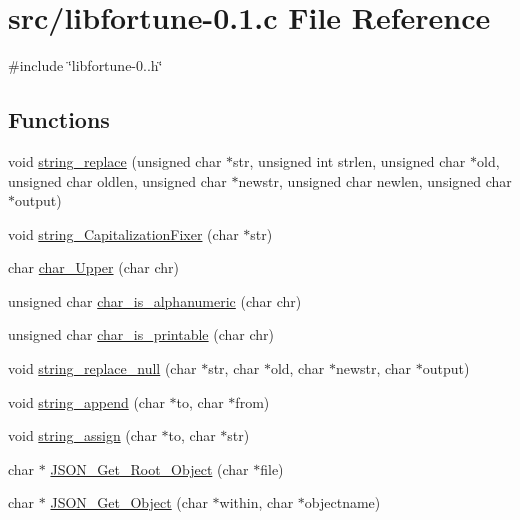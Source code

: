\hypertarget{libfortune-0_81_8c}{\section{src/libfortune-\/0.1.c \-File \-Reference}
\label{libfortune-0_81_8c}
}
{\ttfamily \#include \char`\"{}libfortune-\/0..\-h\char`\"{}}\*
\subsection*{\-Functions}
\begin{DoxyCompactItemize}
\item 
void \hyperlink{libfortune-0_81_8c_a34e8a513afcfa4403dffda13063965e1}{string\-\_\-replace} (unsigned char $\ast$str, unsigned int strlen, unsigned char $\ast$old, unsigned char oldlen, unsigned char $\ast$newstr, unsigned char newlen, unsigned char $\ast$output)
\item 
void \hyperlink{libfortune-0_81_8c_aa97238a3b3c89c08eacae8eef4791ba2}{string\-\_\-\-Capitalization\-Fixer} (char $\ast$str)
\item 
char \hyperlink{libfortune-0_81_8c_aad4c1f6d2aae5997bc9c56902a423169}{char\-\_\-\-Upper} (char chr)
\item 
unsigned char \hyperlink{libfortune-0_81_8c_a2e810294066643b8000791d99fd1fde5}{char\-\_\-is\-\_\-alphanumeric} (char chr)
\item 
unsigned char \hyperlink{libfortune-0_81_8c_ad06e792d0883bbdb216202dba5c93a49}{char\-\_\-is\-\_\-printable} (char chr)
\item 
void \hyperlink{libfortune-0_81_8c_af0154798b85d945348afb48a9a0a750a}{string\-\_\-replace\-\_\-null} (char $\ast$str, char $\ast$old, char $\ast$newstr, char $\ast$output)
\item 
void \hyperlink{libfortune-0_81_8c_ab62809f3ff93cae257d54b93016c7aef}{string\-\_\-append} (char $\ast$to, char $\ast$from)
\item 
void \hyperlink{libfortune-0_81_8c_af7779d4d40718fc33ce0d86ff73554e8}{string\-\_\-assign} (char $\ast$to, char $\ast$str)
\item 
char $\ast$ \hyperlink{libfortune-0_81_8c_a98b13204bb0f4c3dbaef87259767dfcf}{\-J\-S\-O\-N\-\_\-\-Get\-\_\-\-Root\-\_\-\-Object} (char $\ast$file)
\item 
char $\ast$ \hyperlink{libfortune-0_81_8c_ab377ac6d910580c12475a2c52c5a6fbd}{\-J\-S\-O\-N\-\_\-\-Get\-\_\-\-Object} (char $\ast$within, char $\ast$objectname)
\item 

\end{DoxyCompactItemize}
